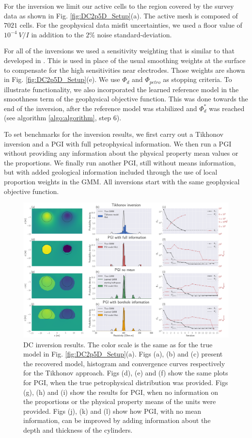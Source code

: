 \documentclass[extra]{gji} %
\begin{document}
For the inversion we limit our active cells to the region covered by the survey data as shown in Fig. \ref{fig:DC2p5D_Setup}(a). The active mesh is composed of $7021$ cells. For the geophysical data misfit uncertainties, we used a floor value of $10^{-4}~V/I$ in addition to the $2\%$ noise standard-deviation.

For all of the inversions we used a sensitivity weighting that is similar to that developed in \cite{doi:10.1190/1.1820468}. This is used in place of the usual smoothing weights at the surface to compensate for the high sensitivities near electrodes. Those weights are shown in Fig. \ref{fig:DC2p5D_Setup}(e). We use $\Phi_d$ and $\Phi_{petro}$ as stopping criteria. To illustrate functionality, we also incorporated the learned reference model in the smoothness term of the geophysical objective function. This was done towards the end of the inversion, after the reference model was stabilized and $\Phi_d^*$ was reached (see algorithm \ref{algo:algorithm}, step 6).

To set benchmarks for the inversion results, we first carry out a Tikhonov inversion and a PGI with full petrophysical information. We then run a PGI without providing any information about the physical property mean values or the proportions. We finally run another PGI, still without means information, but with added geological information included through the use of local proportion weights in the GMM. All inversions start with the same geophysical objective function.

\begin{figure}
\centering
\includegraphics[width=\textwidth]{Fig/LowRes/DC2p5D_Result.png}
\caption{DC inversion results. The color scale is the same as for the true model in Fig. \ref{fig:DC2p5D_Setup}(a). Figs (a), (b) and (c) present the recovered model, histogram and convergence curves respectively for the Tikhonov approach. Figs (d), (e) and (f) show the same plots for PGI, when the true petrophysical distribution was provided. Figs (g), (h) and (i) show the results for PGI, when no information on the proportions or the physical property means of the units were provided. Figs (j), (k) and (l) show how PGI, with no mean information, can be improved by adding information about the  depth and thickness of the cylinders.}
\label{fig:DC2p5D_Result}
\end{figure}
\end{document}

